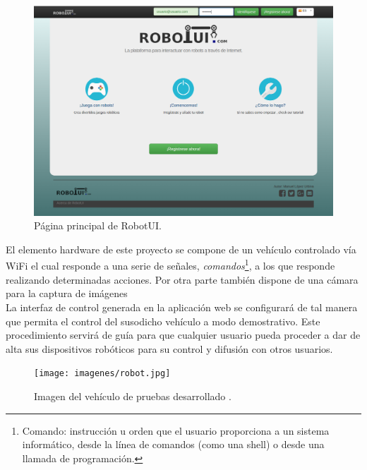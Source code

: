 \documentclass[a4paper,12pt]{article}
\begin{document}
\begin{figure}[H]
  \begin{center}
    \includegraphics[scale=0.3]{imagenes/pagina-principal.png}
  \end{center}
 \caption{Página principal de RobotUI.}
\end{figure}


El elemento hardware de este proyecto se compone de un vehículo controlado vía WiFi el cual responde a una serie de señales, \emph{comandos}\footnote{ Comando: instrucción u orden que el usuario proporciona a un sistema informático, 
desde la línea de comandos (como una shell) o desde una llamada de programación.}, a los que responde realizando determinadas acciones. Por otra parte también dispone de una cámara para la captura de imágenes\\

La interfaz de control generada en la aplicación web se configurará de tal manera que permita el control del susodicho vehículo a modo demostrativo. Este procedimiento servirá de guía para que cualquier usuario pueda proceder a dar de alta sus dispositivos 
robóticos para su control y difusión con otros usuarios.\\

\begin{figure}[H]
  \begin{center}
    \texttt{[image: imagenes/robot.jpg]}
  \end{center}
  \label{fig:logo}
 \caption{Imagen del vehículo de pruebas desarrollado \protect\footnotemark.}
\end{figure}

\end{document}
